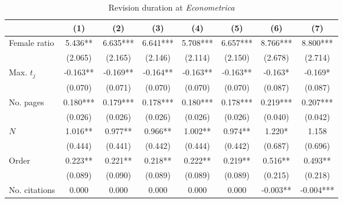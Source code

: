 \begin{table}
    \begin{adjustwidth}{-0.085cm}{}
    \footnotesize
    \centering
    \begin{threeparttable}
        \caption{Revision duration at \textit{Econometrica}}
        \label{table11}
        \begin{tabular}{p{2.64cm}SSSSSSS}
            \toprule
            &{(1)}&{(2)}&{(3)}&{(4)}&{(5)}&{(6)}&{(7)}\\
            \midrule
            Female ratio                  &       5.436** &       6.635***&       6.641***&       5.708***&       6.657***&       8.766***&       8.800***\\
                                          &     (2.065)   &     (2.165)   &     (2.146)   &     (2.114)   &     (2.150)   &     (2.678)   &     (2.714)   \\
            Max. \(t_j\)                  &      -0.163** &      -0.169** &      -0.164** &      -0.163** &      -0.163** &      -0.163*  &      -0.169*  \\
                                          &     (0.070)   &     (0.071)   &     (0.070)   &     (0.070)   &     (0.070)   &     (0.087)   &     (0.087)   \\
            No. pages                     &       0.180***&       0.179***&       0.178***&       0.180***&       0.178***&       0.219***&       0.207***\\
                                          &     (0.026)   &     (0.026)   &     (0.026)   &     (0.026)   &     (0.026)   &     (0.040)   &     (0.042)   \\
            \(N\)                         &       1.016** &       0.977** &       0.966** &       1.002** &       0.974** &       1.220*  &       1.158   \\
                                          &     (0.444)   &     (0.441)   &     (0.442)   &     (0.444)   &     (0.442)   &     (0.687)   &     (0.696)   \\
            Order                         &       0.223** &       0.221** &       0.218** &       0.222** &       0.219** &       0.516** &       0.493** \\
                                          &     (0.089)   &     (0.090)   &     (0.089)   &     (0.089)   &     (0.089)   &     (0.215)   &     (0.218)   \\
            No. citations                 &       0.000   &       0.000   &       0.000   &       0.000   &       0.000   &      -0.003** &      -0.004***\\

\end{tabular}
\end{threeparttable}
\end{adjustwidth}
\end{table}
